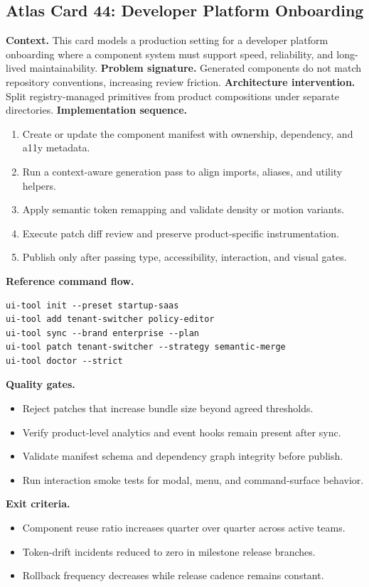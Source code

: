 \subsection*{Atlas Card 44: Developer Platform Onboarding}
\textbf{Context.} This card models a production setting for a developer platform onboarding where a component system must support speed, reliability, and long-lived maintainability.
\textbf{Problem signature.} Generated components do not match repository conventions, increasing review friction.
\textbf{Architecture intervention.} Split registry-managed primitives from product compositions under separate directories.
\textbf{Implementation sequence.}
\begin{enumerate}[leftmargin=*, itemsep=0.28em]
  \item Create or update the component manifest with ownership, dependency, and a11y metadata.
  \item Run a context-aware generation pass to align imports, aliases, and utility helpers.
  \item Apply semantic token remapping and validate density or motion variants.
  \item Execute patch diff review and preserve product-specific instrumentation.
  \item Publish only after passing type, accessibility, interaction, and visual gates.
\end{enumerate}
\textbf{Reference command flow.}
\begin{verbatim}
ui-tool init --preset startup-saas
ui-tool add tenant-switcher policy-editor
ui-tool sync --brand enterprise --plan
ui-tool patch tenant-switcher --strategy semantic-merge
ui-tool doctor --strict
\end{verbatim}
\textbf{Quality gates.}
\begin{itemize}[leftmargin=*, itemsep=0.24em]
  \item Reject patches that increase bundle size beyond agreed thresholds.
  \item Verify product-level analytics and event hooks remain present after sync.
  \item Validate manifest schema and dependency graph integrity before publish.
  \item Run interaction smoke tests for modal, menu, and command-surface behavior.
\end{itemize}
\textbf{Exit criteria.}
\begin{itemize}[leftmargin=*, itemsep=0.24em]
  \item Component reuse ratio increases quarter over quarter across active teams.
  \item Token-drift incidents reduced to zero in milestone release branches.
  \item Rollback frequency decreases while release cadence remains constant.
\end{itemize}
\clearpage
